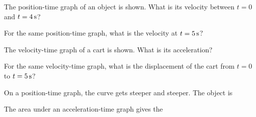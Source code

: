 \begin{exo}{}
The position-time graph of an object is shown. What is its velocity between $t=0$ and $t=4\,\mathrm{s}$?
\gQx
\choices{$2\ms$}{$2.5\ms$}{$8\ms$}{$10\ms$}
\end{exo}
\begin{exo}{}
For the same position-time graph, what is the velocity at $t=5\,\mathrm{s}$?
\gQx
{}
\end{exo}
\begin{exo}{}
The velocity-time graph of a cart is shown. What is its acceleration?
\gQv
\choices{$-10\mss$}{$2\mss$}{$10\mss$}{$-2\mss$}
\end{exo}
\begin{exo}{}
For the same velocity-time graph, what is the displacement of the cart from $t=0$ to $t=5\,\mathrm{s}$?
\gQv
\choices{$50\m$}{$10\m$}{$25\m$}{$5\m$}
\end{exo}
\begin{exo}{}
On a position-time graph, the curve gets steeper and steeper. The object is
\end{exo}
\begin{exo}{}
The area under an acceleration-time graph gives the
\end{exo}

